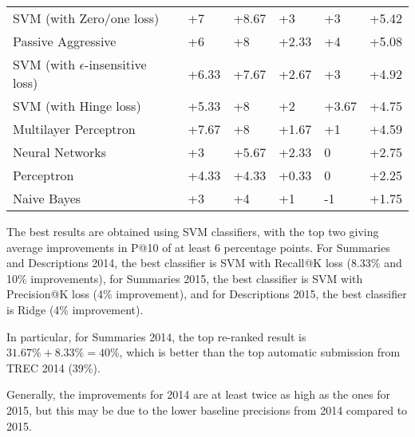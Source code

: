 \begin{table}
{\begin{tabular}{@{}llllll@{}}
SVM (with Zero/one loss)            	& +7                       & +8.67                       & +3                       & +3                          & +5.42             \\
Passive Aggressive              	& +6                       & +8                          & +2.33                    & +4                          & +5.08             \\
SVM (with $\epsilon$-insensitive loss)	& +6.33                    & +7.67                       & +2.67                    & +3                          & +4.92             \\
SVM (with Hinge loss)              	& +5.33                    & +8                          & +2                       & +3.67                       & +4.75             \\
Multilayer Perceptron            	& +7.67                    & +8                          & +1.67                    & +1                          & +4.59             \\
Neural Networks                  	& +3                       & +5.67                       & +2.33                    & 0                           & +2.75             \\
Perceptron                          	& +4.33                    & +4.33                       & +0.33                    & 0                           & +2.25             \\
Naive Bayes                        	& +3                       & +4                          & +1                       & -1                          & +1.75             \\ \bottomrule
\end{tabular}%
}
\end{table}

The best results are obtained using SVM classifiers, with the top two giving average improvements in P@10 of at least 6 percentage
points. For Summaries and Descriptions 2014, the best classifier is SVM with Recall@K loss (8.33\% and 10\% improvements),
for Summaries 2015, the best classifier is SVM with Precision@K loss (4\% improvement),
and for Descriptions 2015, the best classifier is Ridge (4\% improvement).

In particular, for Summaries 2014, the top re-ranked result is $31.67\%+8.33\% = 40\%$, which is better than the top automatic submission
from TREC 2014 (39\%).

Generally, the improvements for 2014 are at least
twice as high as the ones for 2015, but this may be due to the lower baseline precisions from 2014 compared to 2015.

